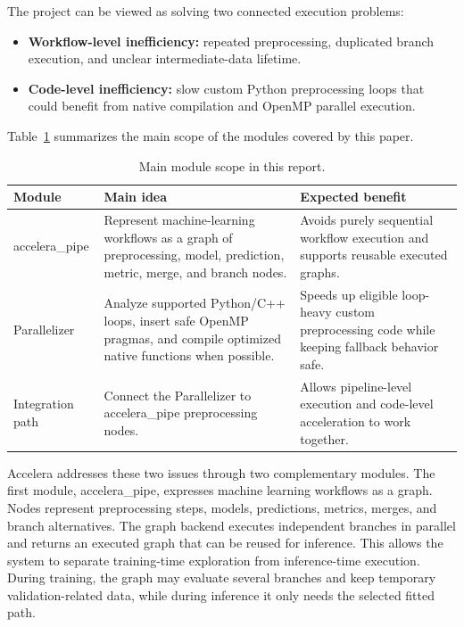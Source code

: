 \documentclass[12pt,a4paper,oneside]{report}
\begin{document}
The project can be viewed as solving two connected execution problems:

\begin{itemize}[leftmargin=1.2cm]
  \item \textbf{Workflow-level inefficiency:} repeated preprocessing, duplicated
  branch execution, and unclear intermediate-data lifetime.
  \item \textbf{Code-level inefficiency:} slow custom Python preprocessing loops
  that could benefit from native compilation and OpenMP parallel execution.
\end{itemize}

Table~\ref{tab:intro-module-scope} summarizes the main scope of the modules
covered by this paper.

\begin{table}[!htbp]
\centering
\caption{Main module scope in this report.}
\label{tab:intro-module-scope}
\small
\renewcommand{\arraystretch}{1.15}
\setlength{\tabcolsep}{4pt}
\begin{tabularx}{\textwidth}{p{}X X}
\toprule
Module & Main idea & Expected benefit \\
\midrule
accelera\_pipe &
Represent machine-learning workflows as a graph of preprocessing, model,
prediction, metric, merge, and branch nodes. &
Avoids purely sequential workflow execution and supports reusable executed
graphs. \\

Parallelizer &
Analyze supported Python/C++ loops, insert safe OpenMP pragmas, and compile
optimized native functions when possible. &
Speeds up eligible loop-heavy custom preprocessing code while keeping fallback
behavior safe. \\

Integration path &
Connect the Parallelizer to accelera\_pipe preprocessing nodes. &
Allows pipeline-level execution and code-level acceleration to work together. \\
\bottomrule
\end{tabularx}
\renewcommand{\arraystretch}{1.0}
\end{table}

Accelera addresses these two issues through two complementary modules. The first
module, accelera\_pipe, expresses machine learning workflows as a
graph. Nodes represent preprocessing steps, models, predictions, metrics,
merges, and branch alternatives. The graph backend executes independent branches
in parallel and returns an executed graph that can be reused for inference. This
allows the system to separate training-time exploration from inference-time
execution. During training, the graph may evaluate several branches and keep
temporary validation-related data, while during inference it only needs the
selected fitted path.
\end{document}
